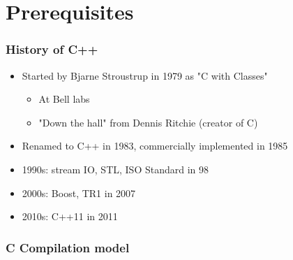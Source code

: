 \documentclass{beamer}
\begin{document}

\section{Prerequisites}

\begin{frame}
    \frametitle{History of C++}



    \begin{itemize}
        \item<1->Started by Bjarne Stroustrup in 1979 as "C with Classes"
            \begin{itemize}
                \item At Bell labs
                \item "Down the hall" from Dennis Ritchie (creator of C)
            \end{itemize}
        \item<1->Renamed to C++ in 1983, commercially implemented in 1985
        \item<2->1990s: stream IO, STL, ISO Standard in 98
        \item<3->2000s: Boost, TR1 in 2007
        \item<4->2010s: C++11 in 2011
    \end{itemize}
\end{frame}

\begin{frame}
    \frametitle{C Compilation model}

\end{frame}
\end{document}
